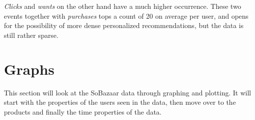     \emph{Clicks} and \emph{wants} on the other hand have a much higher occurrence. These two events together with \emph{purchases} tops a count of 20 on average per user, and opens for the possibility of more dense personalized recommendations, but the data is still rather sparse.



\section{Graphs}
    This section will look at the SoBazaar data through graphing and plotting.
    It will start with the properties of the users seen in the data, then move over to the products and finally the time properties of the data.

